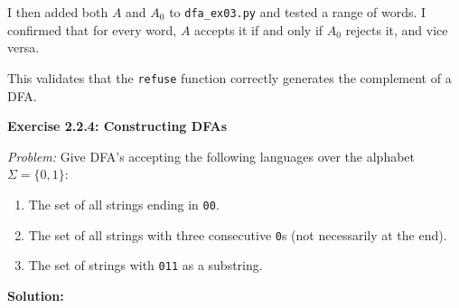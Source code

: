 \documentclass{article}
\theoremstyle{theorem}
\theoremstyle{definition}
\theoremstyle{remark}
\begin{document}
I then added both $A$ and $A_0$ to \texttt{dfa\_ex03.py} and tested a range of words. I confirmed that for every word, $A$ accepts it if and only if $A_0$ rejects it, and vice versa.

This validates that the \texttt{refuse} function correctly generates the complement of a DFA.


\textbf{Exercise 2.2.4: Constructing DFAs}

\textit{Problem:}  
Give DFA’s accepting the following languages over the alphabet $\Sigma = \{0, 1\}$:

\begin{enumerate}
  \item The set of all strings ending in \texttt{00}.
  \item The set of all strings with three consecutive \texttt{0}s (not necessarily at the end).
  \item The set of strings with \texttt{011} as a substring.
\end{enumerate}

\vspace{1em}

\textbf{Solution:}
\end{document}
